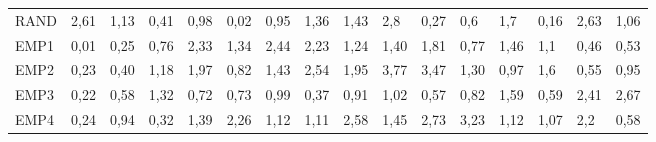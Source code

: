 \documentclass{tPRS2e}
\begin{document}
\begin{table}[h]
{\begin{tabular}{l|lllllllllllllll}
		RAND & 2,61                  & 1,13                  & 0,41                  & 0,98                  & 0,02                  & 0,95                  & 1,36                  & 1,43                  & 2,8                   & 0,27                   & 0,6                    & 1,7                    & 0,16                   & 2,63                   & 1,06                   \\
		EMP1 & 0,01                  & 0,25                  & 0,76                  & 2,33                  & 1,34                  & 2,44                  & 2,23                  & 1,24                  & 1,40                  & 1,81                   & 0,77                   & 1,46                   & 1,1                    & 0,46                   & 0,53                   \\
		EMP2 & 0,23                  & 0,40                  & 1,18                  & 1,97                  & 0,82                  & 1,43                  & 2,54                  & 1,95                  & 3,77                  & 3,47                   & 1,30                   & 0,97                   & 1,6                    & 0,55                   & 0,95                   \\
		EMP3 & 0,22                  & 0,58                  & 1,32                  & 0,72                  & 0,73                  & 0,99                  & 0,37                  & 0,91                  & 1,02                  & 0,57                   & 0,82                   & 1,59                   & 0,59                   & 2,41                   & 2,67                   \\
		EMP4 & 0,24                  & 0,94                  & 0,32                  & 1,39                  & 2,26                  & 1,12                  & 1,11                  & 2,58                  & 1,45                  & 2,73                   & 3,23                   & 1,12                   & 1,07                   & 2,2                    & 0,58                  
	\end{tabular}}
\end{table}
\end{document}
